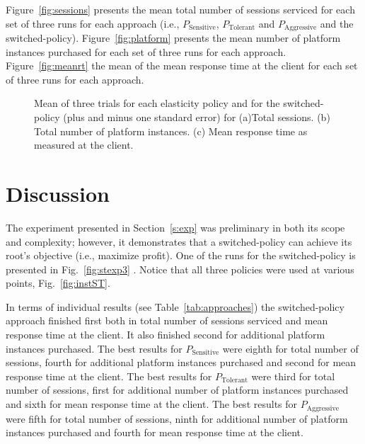 Figure~\ref{fig:sessions} presents the mean total number of sessions serviced for each set of three runs
for each approach (i.e., $P_\text{Sensitive}$, $P_\text{Tolerant}$ and $P_\text{Aggressive}$ and the  switched-policy).  
Figure~\ref{fig:platform} presents the mean number of platform instances purchased for each set of three runs 
for each approach. 
Figure~\ref{fig:meanrt} the mean of the mean response time at the client for each set of three runs
for each approach. 
\begin{figure}[h]
  \centering
\caption{Mean of three trials for each elasticity policy and for the  switched-policy (plus and minus one standard error) for  (a)Total sessions. (b) Total number of platform instances. (c) Mean response time
as measured at the client.}
\label{fig:results}
\end{figure} 

\section{Discussion}
\label{s:discuss} 
The  experiment presented in Section~\ref{s:exp} was preliminary in both its scope and complexity; however, it demonstrates that a  switched-policy can achieve its root's objective (i.e., maximize profit).  
 One of the runs for the  switched-policy is presented in Fig.~\ref{fig:stexp3} .  Notice that all three policies were used at various points, Fig.~\ref{fig:instST}.  
 
 In terms of individual results (see Table~\ref{tab:approaches}) the  switched-policy approach finished first both in total number of sessions serviced and mean response time at the client.  It also finished second for additional platform instances purchased. The best results for $P_\text{Sensitive}$ were eighth for total number of sessions, fourth for additional platform instances purchased and second for mean response time at the client.   The best results for $P_\text{Tolerant}$ were third for total number of sessions, first for additional number of platform instances purchased and sixth for mean response time at the client.  The best results for $P_\text{Aggressive}$ were fifth for total number of sessions, ninth for additional number of platform instances purchased and fourth for mean response time at the client. 


